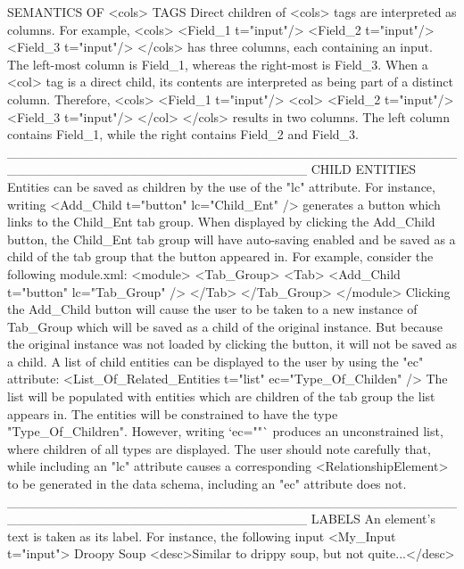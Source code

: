 SEMANTICS OF <cols> TAGS\crlf
\crlf
Direct children of <cols> tags are interpreted as columns. For example,\crlf
<cols>\crlf
<Field_1 t="input"/>\crlf
<Field_2 t="input"/>\crlf
<Field_3 t="input"/>\crlf
</cols>\crlf
has three columns, each containing an input. The left-most column is Field_1,\crlf
whereas the right-most is Field_3.\crlf
\crlf
When a <col> tag is a direct child, its contents are interpreted as being part\crlf
of a distinct column. Therefore,\crlf
<cols>\crlf
<Field_1 t="input"/>\crlf
<col>\crlf
<Field_2 t="input"/>\crlf
<Field_3 t="input"/>\crlf
</col>\crlf
</cols>\crlf
results in two columns. The left column contains Field_1, while the right\crlf
contains Field_2 and Field_3.\crlf
________________________________________________________________________________\crlf
\crlf
CHILD ENTITIES\crlf
\crlf
Entities can be saved as children by the use of the "lc" attribute. For\crlf
instance, writing\crlf
<Add_Child t="button" lc="Child_Ent" />\crlf
generates a button which links to the Child_Ent tab group. When displayed by\crlf
clicking the Add_Child button, the Child_Ent tab group will have auto-saving\crlf
enabled and be saved as a child of the tab group that the button appeared in.\crlf
For example, consider the following module.xml:\crlf
<module>\crlf
<Tab_Group>\crlf
<Tab>\crlf
<Add_Child t="button" lc="Tab_Group" />\crlf
</Tab>\crlf
</Tab_Group>\crlf
</module>\crlf
Clicking the Add_Child button will cause the user to be taken to a new\crlf
instance of Tab_Group which will be saved as a child of the original instance.\crlf
But because the original instance was not loaded by clicking the button, it\crlf
will not be saved as a child.\crlf
\crlf
A list of child entities can be displayed to the user by using the "ec"\crlf
attribute:\crlf
<List_Of_Related_Entities t="list" ec="Type_Of_Childen" />\crlf
The list will be populated with entities which are children of the tab group\crlf
the list appears in. The entities will be constrained to have the type\crlf
"Type_Of_Children". However, writing `ec=""` produces an unconstrained list,\crlf
where children of all types are displayed.\crlf
\crlf
The user should note carefully that, while including an "lc" attribute causes\crlf
a corresponding <RelationshipElement> to be generated in the data schema,\crlf
including an "ec" attribute does not.\crlf
________________________________________________________________________________\crlf
\crlf
LABELS\crlf
\crlf
An element's text is taken as its label. For instance, the following input\crlf
<My_Input t="input">\crlf
Droopy Soup\crlf
<desc>Similar to drippy soup, but not quite...</desc>\crlf
